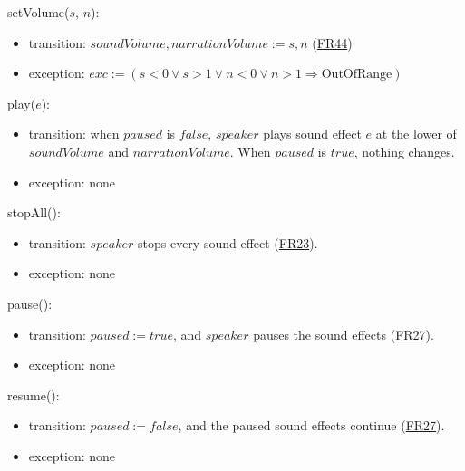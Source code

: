 \documentclass[10pt, titlepage]{article}
\newcommand{\srsurl}{https://team-hindsight.github.io/ophthamology-game/SRS/SRS.pdf}
\newcommand{\srsitemref}[2]{\href{\srsurl\#nameddest=#1}{#2}}
\newcommand{\T}[1]{\mathit{#1}}          %
\newcommand{\exc}{\mathit{exc}}
\newcommand{\true}{\mathit{true}}
\newcommand{\false}{\mathit{false}}
\begin{document}
\begin{samepage}
\noindent setVolume($s$, $n$):
\begin{itemize}
\item transition: $\T{soundVolume}, \T{narrationVolume} := s, n$
  (\srsitemref{FR_Preferences}{FR44})
\item exception: $\exc := (s < 0 \vee s > 1 \vee n < 0 \vee n > 1
  \Rightarrow \text{OutOfRange})$
\end{itemize}
\end{samepage}
\par\pagebreak[0]

\begin{samepage}
\noindent play($e$):
\begin{itemize}
\item transition: when $\T{paused}$ is $\false$, $\T{speaker}$ plays sound
  effect $e$ at the lower of $\T{soundVolume}$ and $\T{narrationVolume}$. When
  $\T{paused}$ is $\true$, nothing changes.
\item exception: none
\end{itemize}
\end{samepage}
\par\pagebreak[0]

\begin{samepage}
\noindent stopAll():
\begin{itemize}
\item transition: $\T{speaker}$ stops every sound effect
  (\srsitemref{FR_StopOnExit}{FR23}).
\item exception: none
\end{itemize}
\end{samepage}
\par\pagebreak[0]

\begin{samepage}
\noindent pause():
\begin{itemize}
\item transition: $\T{paused} := \true$, and $\T{speaker}$ pauses the sound
  effects (\srsitemref{FR_Suspend}{FR27}).
\item exception: none
\end{itemize}
\end{samepage}
\par\pagebreak[0]

\begin{samepage}
\noindent resume():
\begin{itemize}
\item transition: $\T{paused} := \false$, and the paused sound effects
  continue (\srsitemref{FR_Suspend}{FR27}).
\item exception: none
\end{itemize}
\end{samepage}
\par\pagebreak[0]
\end{document}
